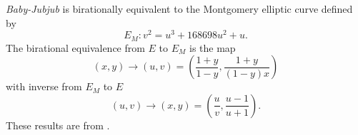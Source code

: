 {\it{Baby-Jubjub}} is birationally equivalent to the Montgomery elliptic curve defined by  
	$$ E_M : v^2 = u^3 + 168698 u^2 + u. $$
The birational equivalence from $E$ to $E_M$ is the map 
	$$ (x,y) \to (u,v) = \left( \frac{1 + y}{1 - y} , \frac{1 + y}{(1 - y)x} \right) $$
with inverse from $E_M$ to $E$
	$$ (u, v) \to (x, y) = \left(  \frac{u}{v}, \frac{u - 1}{u + 1}   \right). $$
These results are from \cite[Theorem 3.2]{twisted}.